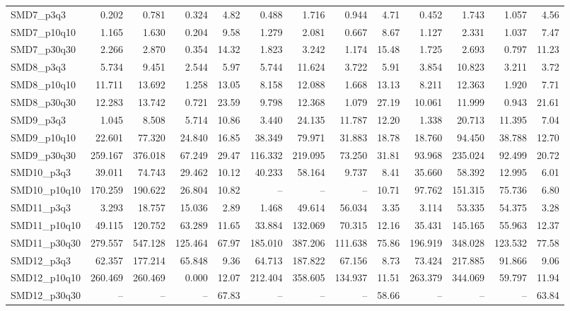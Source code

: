 \begin{longtable}{lrrrrrrrrrrrr}
SMD7\_p3q3 & 0.202 & 0.781 & 0.324 & 4.82 & 0.488 & 1.716 & 0.944 & 4.71 & 0.452 & 1.743 & 1.057 & 4.56 \\
SMD7\_p10q10 & 1.165 & 1.630 & 0.204 & 9.58 & 1.279 & 2.081 & 0.667 & 8.67 & 1.127 & 2.331 & 1.037 & 7.47 \\
SMD7\_p30q30 & 2.266 & 2.870 & 0.354 & 14.32 & 1.823 & 3.242 & 1.174 & 15.48 & 1.725 & 2.693 & 0.797 & 11.23 \\
SMD8\_p3q3 & 5.734 & 9.451 & 2.544 & 5.97 & 5.744 & 11.624 & 3.722 & 5.91 & 3.854 & 10.823 & 3.211 & 3.72 \\
SMD8\_p10q10 & 11.711 & 13.692 & 1.258 & 13.05 & 8.158 & 12.088 & 1.668 & 13.13 & 8.211 & 12.363 & 1.920 & 7.71 \\
SMD8\_p30q30 & 12.283 & 13.742 & 0.721 & 23.59 & 9.798 & 12.368 & 1.079 & 27.19 & 10.061 & 11.999 & 0.943 & 21.61 \\
SMD9\_p3q3 & 1.045 & 8.508 & 5.714 & 10.86 & 3.440 & 24.135 & 11.787 & 12.20 & 1.338 & 20.713 & 11.395 & 7.04 \\
SMD9\_p10q10 & 22.601 & 77.320 & 24.840 & 16.85 & 38.349 & 79.971 & 31.883 & 18.78 & 18.760 & 94.450 & 38.788 & 12.70 \\
SMD9\_p30q30 & 259.167 & 376.018 & 67.249 & 29.47 & 116.332 & 219.095 & 73.250 & 31.81 & 93.968 & 235.024 & 92.499 & 20.72 \\
SMD10\_p3q3 & 39.011 & 74.743 & 29.462 & 10.12 & 40.233 & 58.164 & 9.737 & 8.41 & 35.660 & 58.392 & 12.995 & 6.01 \\
SMD10\_p10q10 & 170.259 & 190.622 & 26.804 & 10.82 & -- & -- & -- & 10.71 & 97.762 & 151.315 & 75.736 & 6.80 \\
SMD11\_p3q3 & 3.293 & 18.757 & 15.036 & 2.89 & 1.468 & 49.614 & 56.034 & 3.35 & 3.114 & 53.335 & 54.375 & 3.28 \\
SMD11\_p10q10 & 49.115 & 120.752 & 63.289 & 11.65 & 33.884 & 132.069 & 70.315 & 12.16 & 35.431 & 145.165 & 55.963 & 12.37 \\
SMD11\_p30q30 & 279.557 & 547.128 & 125.464 & 67.97 & 185.010 & 387.206 & 111.638 & 75.86 & 196.919 & 348.028 & 123.532 & 77.58 \\
SMD12\_p3q3 & 62.357 & 177.214 & 65.848 & 9.36 & 64.713 & 187.822 & 67.156 & 8.73 & 73.424 & 217.885 & 91.866 & 9.06 \\
SMD12\_p10q10 & 260.469 & 260.469 & 0.000 & 12.07 & 212.404 & 358.605 & 134.937 & 11.51 & 263.379 & 344.069 & 59.797 & 11.94 \\
SMD12\_p30q30 & -- & -- & -- & 67.83 & -- & -- & -- & 58.66 & -- & -- & -- & 63.84 \\
\end{longtable}
\endgroup

